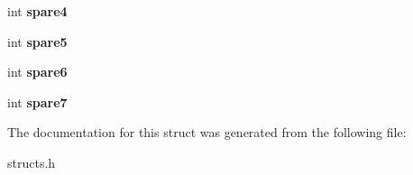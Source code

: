 \begin{DoxyCompactItemize}
\mbox{\label{structrent__info_a8bcad95a13f9a3de272ccdade815c4c4}} 
int {\bfseries spare4}
\item 
\mbox{\label{structrent__info_addb66ad0b25bb54ca317a7d177ee54ab}} 
int {\bfseries spare5}
\item 
\mbox{\label{structrent__info_aa433d349a176d86ce31a086a4b9faee6}} 
int {\bfseries spare6}
\item 
\mbox{\label{structrent__info_aa9a43fcfdd540f4607d8cba875952aef}} 
int {\bfseries spare7}
\end{DoxyCompactItemize}


The documentation for this struct was generated from the following file\+:\begin{DoxyCompactItemize}
\item 
structs.\+h\end{DoxyCompactItemize}
